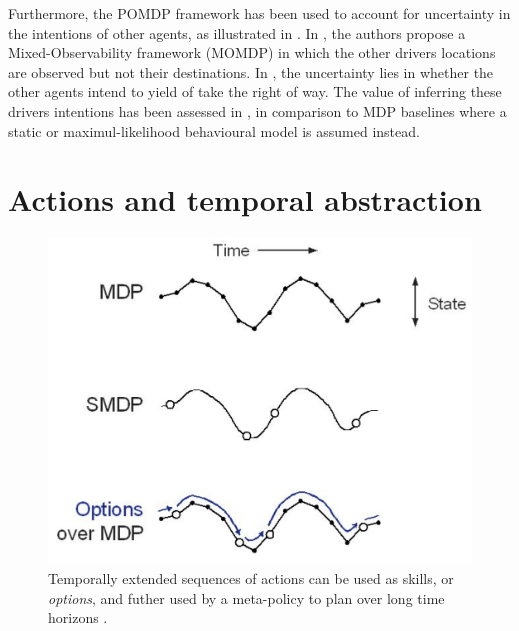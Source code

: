 Furthermore, the \gls{POMDP} framework has been used to account for uncertainty in the intentions of other agents, as illustrated in . In \citep{Bandyopadhyay2013}, the authors propose a Mixed-Observability framework (MOMDP) in which the other drivers locations are observed but not their destinations. In \citep{Barbier2018}, the uncertainty lies in whether the other agents intend to yield of take the right of way. The value of inferring these drivers intentions has been assessed in \citep{Sunberg2017}, in comparison to MDP baselines where a static or maximul-likelihood behavioural model is assumed instead.



\section{Actions and temporal abstraction}
\label{sec:temporal-abstraction}

\begin{figure}[th]
	\centering
	\includegraphics[width=0.5\linewidth]{img/smdp}
	\caption{Temporally extended sequences of actions can be used as skills, or \emph{options}, and futher used by a meta-policy to plan over long time horizons \citep{Sutton1999}.}
	\label{fig:smdp}
\end{figure}

